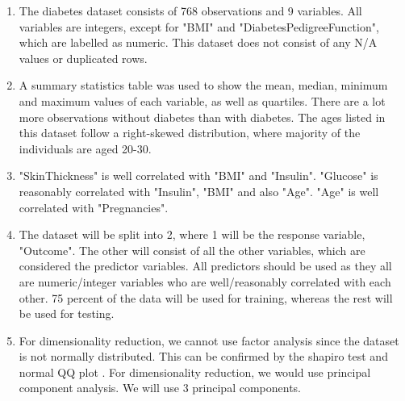 \documentclass[12pt]{article}
\begin{document}
\begin{enumerate} 
	
	\item The diabetes dataset consists of 768 observations and 9 variables. All variables are integers, except for "BMI" and "DiabetesPedigreeFunction", which are labelled as numeric. This dataset does not consist of any N/A values or duplicated rows. 
	
	\item A summary statistics table was used to show the mean, median, minimum and maximum values of each variable, as well as quartiles. There are a lot more observations without diabetes than with diabetes. The ages listed in this dataset follow a right-skewed distribution, where majority of the individuals are aged 20-30. 
	
	\item "SkinThickness" is well correlated with "BMI" and "Insulin". "Glucose" is reasonably correlated with "Insulin", "BMI" and also "Age". "Age" is well correlated with "Pregnancies". 
	
	\item The dataset will be split into 2, where 1 will be the response variable, "Outcome". The other will consist of all the other variables, which are considered the predictor variables. All predictors should be used as they all are numeric/integer variables who are well/reasonably correlated with each other. 75 percent of the data will be used for training, whereas the rest will be used for testing. 
	
	\item For dimensionality reduction, we cannot use factor analysis since the dataset is not normally distributed. This can be confirmed by the shapiro test \cite{Rlang} and normal QQ plot \cite{Rlang}. For dimensionality reduction, we would use principal component analysis. We will use 3 principal components.\\  
	
	
	
		
		
		
		
		
	

\end{enumerate}
\end{document}
